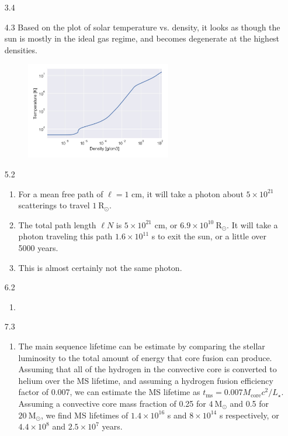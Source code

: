 \documentclass[11pt]{article}
\newcommand\rsol{\mathrm{R}_\odot}
\newcommand\msol{\mathrm{M}_\odot}
\begin{document}
\begin{enumerate}
\item [3.4]

\item [4.3]
    Based on the plot of solar temperature vs. density, it looks as though the sun is mostly in the ideal gas regime, and becomes degenerate at the highest densities.
	\begin{figure}[H]
	\centering
	\includegraphics[width=0.6\textwidth]{temp_density.jpg}
	\end{figure}

\item [5.2]
	\begin{enumerate}
	
    \item For a mean free path of $\ell = 1$ cm, it will take a photon about $5 \times 10^{21}$ scatterings to travel $1~\rsol$.
    
    \item The total path length $\ell N$ is $5 \times 10^{21}$ cm, or $6.9 \times 10^{10}~\rsol$. It will take a photon traveling this path $1.6 \times 10^{11}$ s to exit the sun, or a little over 5000 years.
    
    \item This is almost certainly not the same photon.
    
    \end{enumerate}

\item [6.2]
	\begin{enumerate}
    \item 
    \end{enumerate}

\item [7.3]
	\begin{enumerate}
    \item The main sequence lifetime can be estimate by comparing the stellar luminosity to the total amount of energy that core fusion can produce. Assuming that all of the hydrogen in the convective core is converted to helium over the MS lifetime, and assuming a hydrogen fusion efficiency factor of 0.007, we can estimate the MS lifetime as $t_\mathrm{ms} = 0.007 M_\mathrm{core} c^2 / L_\star$. Assuming a convective core mass fraction of 0.25 for $4~\msol$ and 0.5 for $20~\msol$, we find MS lifetimes of $1.4 \times 10^{16}$ s and $8 \times 10^{14}$ s respectively, or $4.4 \times 10^{8}$ and $2.5 \times 10^{7}$ years.
    

\end{enumerate}
\end{enumerate}
\end{document}

